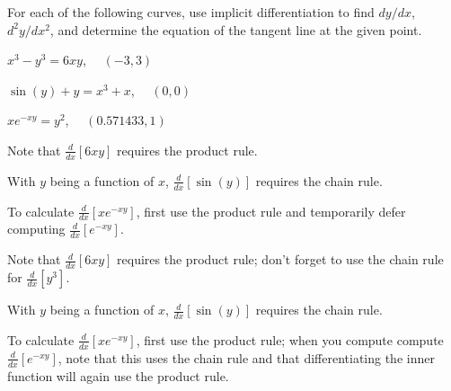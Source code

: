 \begin{activity} \label{A:2.7.3}  
  For each of the following curves, use implicit differentiation to find $dy/dx$, $d^2y/dx^2$, and determine the equation of the tangent line at the given point.
  	\ba
		\item $x^3 - y^3 = 6xy$, \ \ $(-3,3)$
		\item $\sin(y) + y = x^3 + x$, \ \ $(0,0)$
		\item $x e^{-xy} = y^2$, \ \ $(0.571433,1)$
	\ea
\end{activity}
\begin{smallhint}
\ba
	\item Note that $\frac{d}{dx}[6xy]$ requires the product rule.
	\item With $y$ being a function of $x$, $\frac{d}{dx}[\sin(y)]$ requires the chain rule.
	\item To calculate $\frac{d}{dx}[x e^{-xy}]$, first use the product rule and temporarily defer computing $\frac{d}{dx}[e^{-xy}]$.
\ea
\end{smallhint}
\begin{bighint}
\ba
	\item Note that $\frac{d}{dx}[6xy]$ requires the product rule; don't forget to use the chain rule for $\frac{d}{dx}[y^3]$.
	\item With $y$ being a function of $x$, $\frac{d}{dx}[\sin(y)]$ requires the chain rule.
	\item To calculate $\frac{d}{dx}[x e^{-xy}]$, first use the product rule; when you compute compute $\frac{d}{dx}[e^{-xy}]$, note that this uses the chain rule and that differentiating the inner function will again use the product rule.
\ea
\end{bighint}
